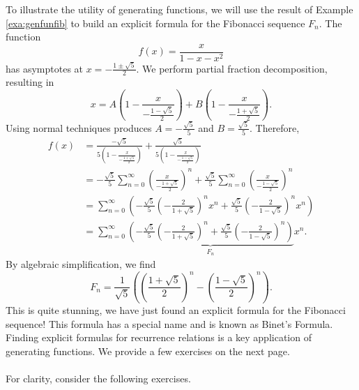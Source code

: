         To illustrate the utility of generating functions, we will use the result of Example \ref{exa:genfunfib} to build an explicit formula for the Fibonacci sequence \(F_n\). The function
        \begin{equation*}
            f(x)=\frac{x}{1-x-x^2}
        \end{equation*}
        has asymptotes at \(x=-\frac{1\pm\sqrt{5}}{2}\). We perform partial fraction decomposition, resulting in
        \begin{equation*}
            x=A\left(1-\frac{x}{-\frac{1-\sqrt{5}}{2}}\right)+B\left(1-\frac{x}{-\frac{1+\sqrt{5}}{2}}\right).
        \end{equation*}
        Using normal techniques produces \(A=-\frac{\sqrt{5}}{5}\) and \(B=\frac{\sqrt{5}}{5}\). Therefore,
        \begin{align*}
            f(x)&=\frac{-\sqrt{5}}{5\left(1-\frac{x}{-\frac{1+\sqrt{5}}{2}}\right)}+\frac{\sqrt{5}}{5\left(1-\frac{x}{-\frac{1-\sqrt{5}}{2}}\right)} \\
            &=-\frac{\sqrt{5}}{5}\sum_{n=0}^\infty \left(\frac{x}{-\frac{1+\sqrt{5}}{2}}\right)^n+\frac{\sqrt{5}}{5}\sum_{n=0}^\infty \left(\frac{x}{-\frac{1-\sqrt{5}}{2}}\right)^n \\
            &=\sum_{n=0}^\infty \left(-\frac{\sqrt{5}}{5}\left(-\frac{2}{1+\sqrt{5}}\right)^nx^n+\frac{\sqrt{5}}{5}\left(-\frac{2}{1-\sqrt{5}}\right)^nx^n\right) \\
            &=\sum_{n=0}^\infty \underbrace{\left(-\frac{\sqrt{5}}{5}\left(-\frac{2}{1+\sqrt{5}}\right)^n+\frac{\sqrt{5}}{5}\left(-\frac{2}{1-\sqrt{5}}\right)^n\right)}_{F_n}x^n.
        \end{align*}
        By algebraic simplification, we find
        \begin{equation*}
            F_n=\frac{1}{\sqrt{5}}\left(\left(\frac{1+\sqrt{5}}{2}\right)^n-\left(\frac{1-\sqrt{5}}{2}\right)^n\right).
        \end{equation*}
        This is quite stunning, we have just found an explicit formula for the Fibonacci sequence! This formula has a special name and is known as Binet's Formula. Finding explicit formulas for recurrence relations is a key application of generating functions. We provide a few exercises on the next page.
        \pagebreak
        \vphantom
        \\
        \\
        For clarity, consider the following exercises.
